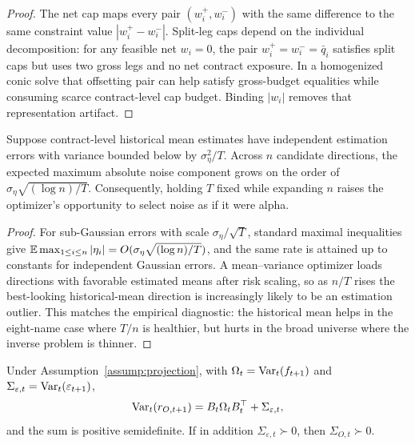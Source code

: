 \begin{proof}
The net cap maps every pair \((w_i^+,w_i^-)\) with the same difference to the same
constraint value \(|w_i^+-w_i^-|\). Split-leg caps depend on the individual decomposition:
for any feasible net \(w_i=0\), the pair \(w_i^+=w_i^-=\bar q_i\) satisfies split caps but
uses two gross legs and no net contract exposure. In a homogenized conic solve that
offsetting pair can help satisfy gross-budget equalities while consuming scarce
contract-level cap budget. Binding \(|w_i|\) removes that representation artifact.
\end{proof}

\begin{proposition}\label{prop:mean_noise_nt}
Suppose contract-level historical mean estimates have independent estimation errors with
variance bounded below by \(\sigma_\eta^2/T\). Across \(n\) candidate directions, the
expected maximum absolute noise component grows on the order of
\(\sigma_\eta\sqrt{(\log n)/T}\). Consequently, holding \(T\) fixed while expanding \(n\)
raises the optimizer's opportunity to select noise as if it were alpha.
\end{proposition}

\begin{proof}
For sub-Gaussian errors with scale \(\sigma_\eta/\sqrt{T}\), standard maximal inequalities
give \(\mathbb{E}\max_{1\le i\le n}|\eta_i|=O(\sigma_\eta\sqrt{(\log n)/T})\), and the same rate is
attained up to constants for independent Gaussian errors. A mean--variance optimizer
loads directions with favorable estimated means after risk scaling, so as \(n/T\) rises
the best-looking historical-mean direction is increasingly likely to be an estimation
outlier. This matches the empirical diagnostic: the historical mean helps in the eight-name
case where \(T/n\) is healthier, but hurts in the broad universe where the inverse problem
is thinner.
\end{proof}

\begin{proposition}\label{prop:cov_psd}
Under Assumption~\ref{assump:projection}, with \(\Omega_t=\operatorname{Var}_t(f_{t+1})\) and
\(\Sigma_{\varepsilon,t}=\operatorname{Var}_t(\varepsilon_{t+1})\),
\[
  \operatorname{Var}_t(r_{O,t+1})=B_t\Omega_tB_t^\top+\Sigma_{\varepsilon,t},
\]
and the sum is positive semidefinite. If in addition \(\Sigma_{\varepsilon,t}\succ0\),
then \(\Sigma_{O,t}\succ0\).
\end{proposition}

